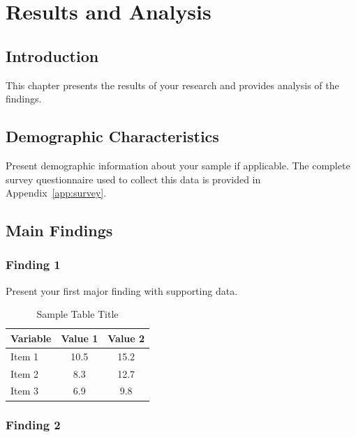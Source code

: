 
\chapter{Results and Analysis}

\section{Introduction}

This chapter presents the results of your research and provides analysis of the findings.

\section{Demographic Characteristics}

Present demographic information about your sample if applicable. The complete survey questionnaire used to collect this data is provided in Appendix~\ref{app:survey}.

\section{Main Findings}

\subsection{Finding 1}

Present your first major finding with supporting data.

\begin{table}[htbp]
\caption{Sample Table Title}
\label{tab:sample}
\centering
\singlespace
\begin{tabular}{lcc}
\toprule
Variable & Value 1 & Value 2 \\
\midrule
Item 1 & 10.5 & 15.2 \\
Item 2 & 8.3 & 12.7 \\
Item 3 & 6.9 & 9.8 \\
\bottomrule
\end{tabular}
\endsinglespace
\end{table}

\subsection{Finding 2}

